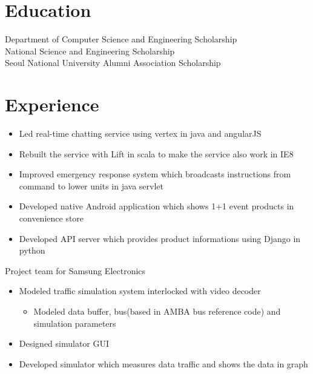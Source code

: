 \documentclass[11pt,a4paper,sans]{moderncv}        %
\begin{document}
\makecvtitle%
\vspace*{-10mm}

\section{Education}
{Department of Computer Science and Engineering Scholarship\\
National Science and Engineering Scholarship\\
Seoul National University Alumni Association Scholarship}

\section{Experience}
{\begin{itemize}%
    \item Led real-time chatting service using vertex in java and angularJS
    \item Rebuilt the service with Lift in scala to make the service also work in IE8
    \item Improved emergency response system which broadcasts instructions from command to lower units in java servlet 
\end{itemize}} 

{\begin{itemize}%
    \item Developed native Android application which shows 1+1 event products in convenience store
    \item Developed API server which provides product informations using Django in python
\end{itemize}}

{Project team for Samsung Electronics
  \begin{itemize}%
    \item Modeled traffic simulation system interlocked with video decoder
      \begin{itemize}
        \item Modeled data buffer, bus(based in AMBA bus reference code) and simulation parameters
      \end{itemize}
    \item Designed simulator GUI
    \item Developed simulator which measures data traffic and shows the data in graph
\end{itemize}}
\end{document}
